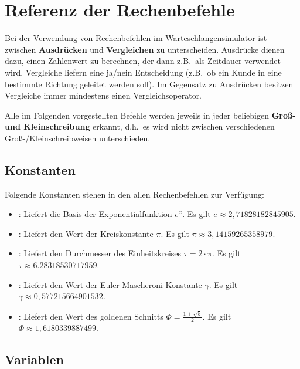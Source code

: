 \part{Referenz der Rechenbefehle}\label{part:Rechenbefehle}

Bei der Verwendung von Rechenbefehlen im Warteschlangensimulator ist zwischen
\textbf{Ausdrücken} und \textbf{Vergleichen} zu unterscheiden. Ausdrücke dienen
dazu, einen Zahlenwert zu berechnen, der dann z.B.\ als Zeitdauer verwendet wird.
Vergleiche liefern eine ja/nein Entscheidung (z.B.\ ob ein Kunde in eine bestimmte
Richtung geleitet werden soll). Im Gegensatz zu Ausdrücken besitzen Vergleiche immer
mindestens einen Vergleichsoperator.

Alle im Folgenden vorgestellten Befehle werden jeweils in jeder beliebigen
\textbf{Groß- und Kleinschreibung} erkannt, d.h.\ es wird nicht zwischen
verschiedenen Groß-/Kleinschreibweisen unterschieden.



\chapter{Konstanten}

Folgende Konstanten stehen in den allen Rechenbefehlen zur Verfügung:

\begin{itemize}

\item
{}: Liefert die Basis der Exponentialfunktion $e^x$. Es gilt
$e\approx 2,71828182845905$.

\item
{}: Liefert den Wert der Kreiskonstante $\pi$. Es gilt
$\pi\approx 3,14159265358979$.

\item
{}: Liefert den Durchmesser des Einheitskreises $\tau=2\cdot\pi$. Es gilt
$\tau\approx 6.28318530717959$.

\item
{}: Liefert den Wert der Euler-Mascheroni-Konstante $\gamma$. Es gilt
$\gamma\approx 0,577215664901532$.

\item
{}: Liefert den Wert des goldenen Schnitts $\Phi=\frac{1+\sqrt5}{2}$. Es gilt
$\Phi\approx1,6180339887499$.

\end{itemize}



\chapter{Variablen}

